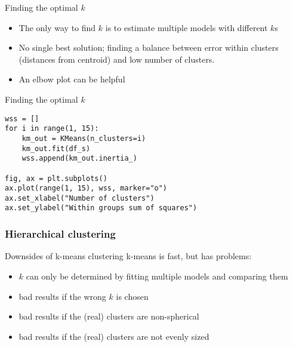 \begin{frame}{Finding the optimal $k$}

\begin{itemize}
\item The only way to find $k$ is to estimate multiple models with different $k$s
\item No single best solution; finding a balance between error within clusters (distances from centroid) and low number of clusters.
\item An elbow plot can be helpful
\end{itemize}
\end{frame}


\begin{frame}{Finding the optimal $k$}
\begin{verbatim}
wss = []
for i in range(1, 15):
    km_out = KMeans(n_clusters=i)
    km_out.fit(df_s)
    wss.append(km_out.inertia_)

fig, ax = plt.subplots()
ax.plot(range(1, 15), wss, marker="o")
ax.set_xlabel("Number of clusters")
ax.set_ylabel("Within groups sum of squares")
\end{verbatim}


\end{frame}





\subsubsection{Hierarchical clustering}

\begin{frame}{Downsides of k-means clustering}
k-means is fast, but has problems:

\begin{itemize}
\item $k$ can only be determined by fitting multiple models and comparing them
\item bad results if the wrong $k$ is chosen
\item bad results if the (real) clusters are non-spherical
\item bad results if the (real) clusters are not evenly sized
\end{itemize}
\end{frame}


